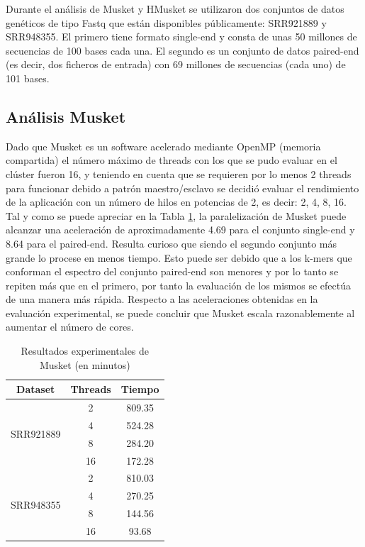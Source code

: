 \documentclass[conference]{IEEEtran}
\begin{document}
Durante el análisis de Musket y HMusket se utilizaron dos conjuntos de datos genéticos de tipo Fastq que están disponibles públicamente: SRR921889 y SRR948355. El primero tiene formato single-end y consta de unas 50 millones de secuencias de 100 bases cada una. El segundo es un conjunto de datos paired-end (es decir, dos ficheros de entrada) con 69 millones de secuencias (cada uno) de 101 bases.


\subsection{Análisis Musket}
Dado que Musket es un software acelerado mediante OpenMP (memoria compartida) el número máximo de threads con los que se pudo evaluar en el clúster fueron 16, y teniendo en cuenta que se requieren por lo menos 2 threads para funcionar debido a patrón maestro/esclavo se decidió evaluar el rendimiento de la aplicación con un número de hilos en potencias de 2, es decir: 2, 4, 8, 16.\\

Tal y como se puede apreciar en la Tabla \ref{musket_experiment_result}, la paralelización de Musket puede alcanzar una aceleración de aproximadamente 4.69 para el conjunto single-end y 8.64 para el paired-end. Resulta curioso que siendo el segundo conjunto más grande lo procese en menos tiempo. Esto puede ser debido que a los k-mers que conforman el espectro del conjunto paired-end son menores y por lo tanto se repiten más que en el primero, por tanto la evaluación de los mismos se efectúa de una manera más rápida. Respecto a las aceleraciones obtenidas en la evaluación experimental, se puede concluir que Musket escala razonablemente al aumentar el número de cores.

\begin{table}[t]
	\centering
	\begin{tabular}{|c|c|c|}
		\hline
		\textbf{Dataset} 				& \textbf{Threads} 		& \textbf{Tiempo} \\ \hline
		\multirow{ 4}{*}{SRR921889} 	& 2			    		& 809.35 	\\ \cline{2-3}
							 			& 4		          		& 524.28	\\ \cline{2-3}
							 			& 8		          		& 284.20 	\\ \cline{2-3}
							 			& 16	           		& 172.28 	\\ \hline \hline
		\multirow{ 4}{*}{SRR948355} 	& 2		         		& 810.03	\\ \cline{2-3}
				 						& 4			           	& 270.25	\\ \cline{2-3}
				 						& 8			          	& 144.56 	\\ \cline{2-3}
				 						& 16	          		& 93.68 	\\ \hline
	\end{tabular}
	\caption{Resultados experimentales de Musket (en minutos)}
	\label{musket_experiment_result}
\end{table}
\end{document}
